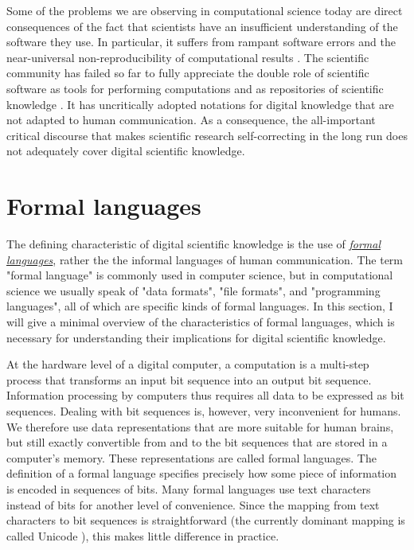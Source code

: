 Some of the problems we are observing in computational science today are direct consequences of the fact that scientists have an insufficient understanding of the software they use. In particular, it suffers from rampant software errors \cite{soergel_rampant_2014,merali_computational_2010} and the near-universal non-reproducibility of computational results \cite{stodden_setting_2013,peng_reproducible_2011}. The scientific community has failed so far to fully appreciate the double role of scientific software as tools for performing computations and as repositories of scientific knowledge \cite{hinsen_computational_2014}. It has uncritically adopted notations for digital knowledge that are not adapted to human communication. As a consequence, the all-important critical discourse that makes scientific research self-correcting in the long run does not adequately cover digital scientific knowledge.

\section{Formal languages}
\label{formal-languages}

The defining characteristic of digital scientific knowledge is the use of \href{http://en.wikipedia.org/wiki/Template:Formal_languages_and_grammars}{\textit{formal languages}}, rather the the informal languages of human communication. The term "formal language" is commonly used in computer science, but in computational science we usually speak of "data formats", "file formats", and "programming languages", all of which are specific kinds of formal languages. In this section, I will give a minimal overview of the characteristics of formal languages, which is necessary for understanding their implications for digital scientific knowledge.

At the hardware level of a digital computer, a computation is a multi-step process that transforms an input bit sequence into an output bit sequence. Information processing by computers thus requires all data to be expressed as bit sequences. Dealing with bit sequences is, however, very inconvenient for humans. We therefore use data representations that are more suitable for human brains, but still exactly convertible from and to the bit sequences that are stored in a computer's memory. These representations are called formal languages. The definition of a formal language specifies precisely how some piece of information is encoded in sequences of bits. Many formal languages use text characters instead of bits for another level of convenience. Since the mapping from text characters to bit sequences is straightforward (the currently dominant mapping is called Unicode \cite{_unicode_2015}), this makes little difference in practice.

